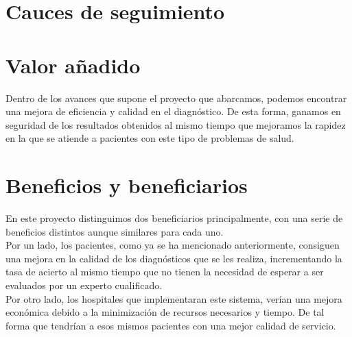 \documentclass[a4paper,12pt,oneside]{article}
\begin{document}
\section{Cauces de seguimiento}

\section{Valor añadido}

Dentro de los avances que supone el proyecto que abarcamos, podemos encontrar una mejora de eficiencia y calidad en el diagnóstico. De esta forma, ganamos en seguridad de los resultados obtenidos al mismo tiempo que mejoramos la rapidez en la que se atiende a pacientes con este tipo de problemas de salud.

\section{Beneficios y beneficiarios}

En este proyecto distinguimos dos beneficiarios principalmente, con una serie de beneficios distintos aunque similares para cada uno. \\

Por un lado, los pacientes, como ya se ha mencionado anteriormente, consiguen una mejora en la calidad de los diagnósticos que se les realiza, incrementando la tasa de acierto al mismo tiempo que no tienen la necesidad de esperar a ser evaluados por un experto cualificado. \\

Por otro lado, los hospitales que implementaran este sistema, verían una mejora económica debido a la minimización de recursos necesarios y tiempo. De tal forma que tendrían a esos mismos pacientes con una mejor calidad de servicio.













\end{document}
